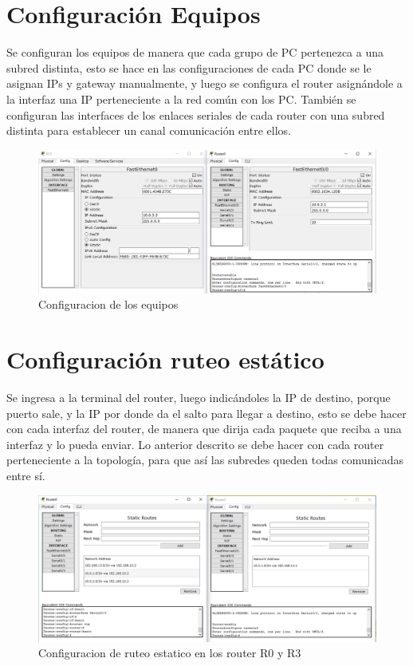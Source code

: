 \documentclass{udpreport}
\begin{document}
	\section{Configuración Equipos}
	Se configuran los equipos de manera que cada grupo de PC pertenezca a una subred distinta, esto se hace en las configuraciones de cada PC
	donde se le asignan IPs y gateway manualmente, y luego se configura el router asignándole a la interfaz una IP perteneciente a la red común con los 
	PC. También se configuran las interfaces de los enlaces seriales de cada router con una subred distinta para establecer un canal comunicación entre ellos.\\
	\begin{figure}[H]
	\centering
	\includegraphics[width=\textwidth]{Configuracion_equipos.PNG}
	\caption{Configuracion de los equipos}
	\end{figure}
	\section{Configuración ruteo estático}
	Se ingresa a la terminal del router, luego indicándoles la IP de destino, porque puerto sale, y la IP por donde da el salto
	para llegar a destino, esto se debe hacer con cada interfaz del router, de manera que dirija cada paquete que reciba a una
	interfaz y lo pueda enviar. Lo anterior descrito se debe hacer con cada router perteneciente a la topología, para que así las
	subredes queden todas comunicadas entre sí.\\
	\begin{figure}[H]
	\centering
	\includegraphics[width=\textwidth]{Ruteo_estatico.PNG}
	\caption{Configuracion de ruteo estatico en los router R0 y R3}
	\end{figure}
\end{document}
